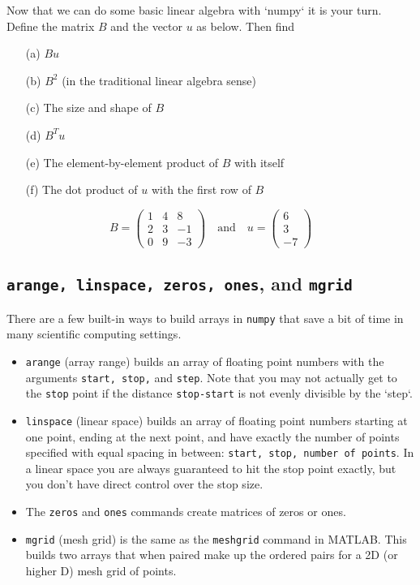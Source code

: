 \begin{problem}
    Now that we can do some basic linear algebra with `numpy` it is your turn.  Define the matrix $B$ and the vector $u$ as below.  Then find

    \begin{enumerate}
        \item[(a)] $Bu$
        \item[(b)] $B^2$ (in the traditional linear algebra sense)
        \item[(c)] The size and shape of $B$
        \item[(d)] $B^T u$
        \item[(e)] The element-by-element product of $B$ with itself
        \item[(f)] The dot product of $u$ with the first row of $B$
    \end{enumerate}

$$ B = \begin{pmatrix} 1 & 4 & 8 \\ 2 & 3 & -1 \\ 0 & 9 & -3 \end{pmatrix} \quad \text{and} \quad u = \begin{pmatrix} 6 \\ 3 \\ -7 \end{pmatrix} $$
\end{problem}

\subsection{\texttt{arange, linspace, zeros, ones}, and \texttt{mgrid}}
There are a few built-in ways to build arrays in \texttt{numpy} that save a bit of time in
many scientific computing settings.  

\begin{itemize}
    \item \texttt{arange} (array range) builds an array of floating point numbers with the
        arguments \texttt{start, stop,} and \texttt{step}.  Note that you may not actually
        get to the \texttt{stop} point if the distance \texttt{stop-start} is not evenly
        divisible by the `step`.
    \item \texttt{linspace} (linear space) builds an array of floating point numbers
        starting at one point, ending at the next point, and have exactly the number of
        points specified with equal spacing in between: \texttt{start, stop, number of
        points}.  In a linear space you are always guaranteed to hit the stop point
        exactly, but you don't have direct control over the stop size.
    \item The \texttt{zeros} and \texttt{ones} commands create matrices of zeros or ones.
    \item \texttt{mgrid} (mesh grid) is the same as the \texttt{meshgrid} command in
        MATLAB.  This builds two arrays that when paired make up the ordered pairs for a
        2D (or higher D) mesh grid of points.
\end{itemize}

